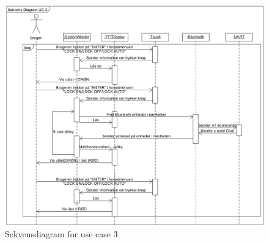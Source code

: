 \begin{figure}[H]
	\centering
	\includegraphics[width = 400 pt]{Img/SD3.png}
	\caption{Sekvensdiagram for use case 3}
	\label{fig:SD3}
\end{figure}